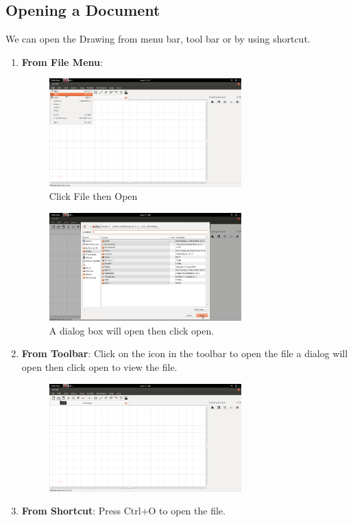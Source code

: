 \subsection{Opening a Document}
We can open the Drawing from menu bar, tool bar or by using shortcut.
 \begin{enumerate}
\item \textbf{From File Menu}:
\begin{figure}[h!]
\centering
\includegraphics[width=0.7\textwidth]{images/fileopen.png}\\
Click File then Open
\end{figure}
\begin{figure}[h!]
\centering
\includegraphics[width=0.7\textwidth]{images/opendialog.png}\\
A dialog box will open then click open.
\end{figure}
\newpage
\item \textbf{From Toolbar}: Click on the icon in the toolbar to open the file a dialog will open then click open to view the file.
\begin{figure}[h!]
\centering
\includegraphics[width=0.7\textwidth]{images/toolopen.png}\\
\end{figure}
\item \textbf{From Shortcut}: Press Ctrl+O to open the file.
\end{enumerate}